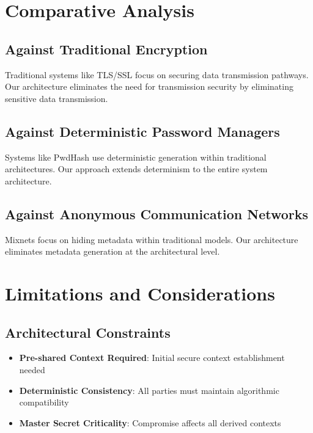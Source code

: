 \documentclass[11pt,a4paper]{article}
\begin{document}
\section{Comparative Analysis}

\subsection{Against Traditional Encryption}

Traditional systems like TLS/SSL focus on securing data transmission pathways. Our architecture eliminates the need for transmission security by eliminating sensitive data transmission.

\subsection{Against Deterministic Password Managers}

Systems like PwdHash use deterministic generation within traditional architectures. Our approach extends determinism to the entire system architecture.

\subsection{Against Anonymous Communication Networks}

Mixnets focus on hiding metadata within traditional models. Our architecture eliminates metadata generation at the architectural level.

\section{Limitations and Considerations}

\subsection{Architectural Constraints}

\begin{itemize}
    \item \textbf{Pre-shared Context Required}: Initial secure context establishment needed
    \item \textbf{Deterministic Consistency}: All parties must maintain algorithmic compatibility
    \item \textbf{Master Secret Criticality}: Compromise affects all derived contexts
\end{itemize}
\end{document}
